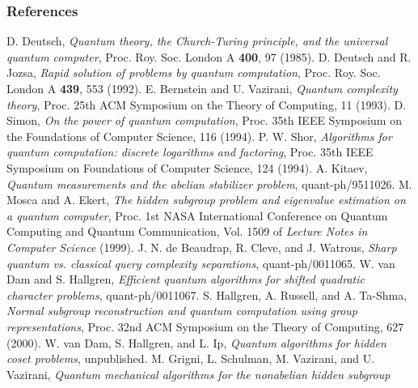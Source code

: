 \documentclass{beamer}
\newcommand{\<}{\langle}
\renewcommand{\>}{\rangle}
\newcommand{\qph}[1]{quant-ph/#1}
\begin{document}
\begin{frame}[allowframebreaks]
    \frametitle{References}
    \begin{thebibliography}{}
          D. Deutsch, 
          {\em Quantum theory, the Church-Turing principle, and the universal
          quantum computer},
          Proc. Roy. Soc. London A {\bf 400}, 97 (1985).
          D. Deutsch and R. Jozsa, 
          {\em Rapid solution of problems by quantum computation}, 
          Proc. Roy. Soc.  London A {\bf 439}, 553 (1992).
          E. Bernstein and U. Vazirani,
          {\em Quantum complexity theory}, 
          Proc. 25th ACM Symposium on the Theory of Computing, 11 (1993).
          D. Simon,
          {\em On the power of quantum computation},
          Proc. 35th IEEE Symposium on the Foundations of Computer Science,
          116 (1994).
          P. W. Shor,
          {\em Algorithms for quantum computation: discrete logarithms and
          factoring},
          Proc. 35th IEEE Symposium on Foundations of Computer Science, 124
          (1994).
          A. Kitaev,
          {\em Quantum measurements and the abelian stabilizer problem},
          \qph{9511026}.
          M. Mosca and A. Ekert,
          {\em The hidden subgroup problem and eigenvalue estimation on a quantum
          computer},
          Proc. 1st NASA International Conference on Quantum Computing and Quantum
          Communication, Vol. 1509 of {\em Lecture Notes in Computer Science}
          (1999).
          J. N. de Beaudrap, R. Cleve, and J. Watrous,
          {\em Sharp quantum vs. classical query complexity separations},
          \qph{0011065}.
          W. van Dam and S. Hallgren,
          {\em Efficient quantum algorithms for shifted quadratic character
          problems},
          \qph{0011067}.
          S. Hallgren, A. Russell, and A. Ta-Shma,
          {\em Normal subgroup reconstruction and quantum computation using group
          representations},
          Proc. 32nd ACM Symposium on the Theory of Computing, 627 (2000).
          W. van Dam, S. Hallgren, and L. Ip,
          {\em Quantum algorithms for hidden coset problems},
          unpublished.
          M. Grigni, L. Schulman, M. Vazirani, and U. Vazirani,
          {\em Quantum mechanical algorithms for the nonabelian hidden subgroup
}
\end{thebibliography}
\end{frame}
\end{document}
